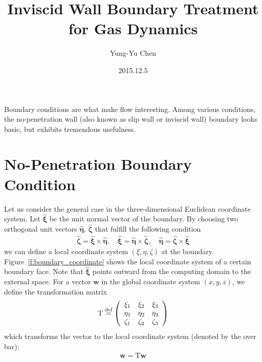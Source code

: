 \documentclass[a4paper,12pt,dvips]{article}
\newcommand*\defeq{\buildrel{\text{def}}\over{=}}
\begin{document}
\title{Inviscid Wall Boundary Treatment for Gas Dynamics}
\author{Yung-Yu Chen}
\date{2015.12.5}

\maketitle

\tableofcontents

\hspace{.5cm}

Boundary conditions are what make flow interesting.  Among various conditions,
the no-penetration wall (also known as slip wall or inviscid wall) boundary
looks basic, but exhibits tremendous usefulness.

\section{No-Penetration Boundary Condition}

Let us consider the general case in the three-dimensional Euclidean coordinate
system.  Let $\hat{\boldsymbol{\xi}}$ be the unit normal vector of the
boundary.  By choosing two orthogonal unit vectors $\hat{\boldsymbol{\eta}}$,
$\hat{\boldsymbol{\zeta}}$ that fulfill the following condition
\begin{align*}
  \hat{\boldsymbol{\zeta}} =
  \hat{\boldsymbol{\xi}} \times \hat{\boldsymbol{\eta}},
  \quad
  \hat{\boldsymbol{\xi}} =
  \hat{\boldsymbol{\eta}} \times \hat{\boldsymbol{\zeta}},
  \quad
  \hat{\boldsymbol{\eta}} =
  \hat{\boldsymbol{\zeta}} \times \hat{\boldsymbol{\xi}}
\end{align*}
we can define a local coordinate system $(\xi, \eta, \zeta)$ at the boundary.
Figure~\ref{f:boundary_coordinate} shows the local coordinate system of a
certain boundary face.  Note that $\hat{\boldsymbol{\xi}}$ points outward from
the computing domain to the external space.  For a vector $\mathbf{w}$ in the
global coordinate system $(x, y, z)$, we define the transformation matrix 
\begin{align*}
  \mathrm{T} \defeq \left(\begin{array}{ccc}
    \xi_1 & \xi_2 & \xi_3 \\
    \eta_1 & \eta_2 & \eta_3 \\
    \zeta_1 & \zeta_2 & \zeta_3
  \end{array}\right)
\end{align*}
which transforms the vector to the local coordinate system (denoted by the
over bar):
\begin{align*}
  \bar{\mathbf{w}} = \mathrm{T}\mathbf{w}
\end{align*}
\end{document}
